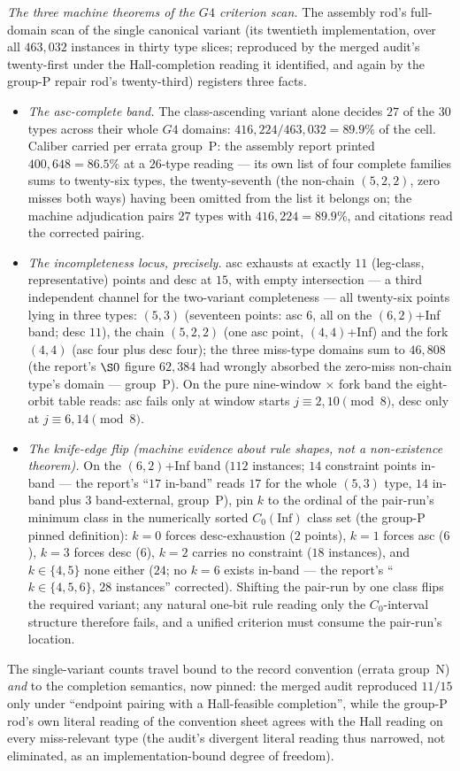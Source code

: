 \emph{The three machine theorems of the $G4$ criterion scan.} The assembly
rod's full-domain scan of the single canonical variant (its twentieth
implementation, over all $463{,}032$ instances in thirty type slices;
reproduced by the merged audit's twenty-first under the Hall-completion
reading it identified, and again by the group-P repair rod's twenty-third)
registers three facts.
\begin{itemize}
\item \emph{The asc-complete band.} The class-ascending variant alone decides
$27$ of the $30$ types across their whole $G4$ domains:
$416{,}224/463{,}032=89.9\%$ of the cell. Caliber carried per errata
group~P: the assembly report printed $400{,}648=86.5\%$ at a $26$-type
reading --- its own list of four complete families sums to twenty-six types,
the twenty-seventh (the non-chain $(5,2,2)$, zero misses both ways) having
been omitted from the list it belongs on; the machine adjudication pairs
$27$ types with $416{,}224=89.9\%$, and citations read the corrected pairing.
\item \emph{The incompleteness locus, precisely.} asc exhausts at exactly
$11$ (leg-class, representative) points and desc at $15$, with empty
intersection --- a third independent channel for the two-variant
completeness --- all twenty-six points lying in three types: $(5,3)$
(seventeen points: asc $6$, all on the $(6,2)$+Inf band; desc $11$), the
chain $(5,2,2)$ (one asc point, $(4,4)$+Inf) and the fork $(4,4)$ (asc four
plus desc four); the three miss-type domains sum to $46{,}808$ (the report's
$\S0$ figure $62{,}384$ had wrongly absorbed the zero-miss non-chain type's
domain --- group~P). On the pure nine-window $\times$ fork band the
eight-orbit table reads: asc fails only at window starts
$j\equiv2,10\pmod8$, desc only at $j\equiv6,14\pmod8$.
\item \emph{The knife-edge flip (machine evidence about rule shapes, not a
non-existence theorem).} On the $(6,2)$+Inf band ($112$ instances; $14$
constraint points in-band --- the report's ``$17$ in-band'' reads $17$ for
the whole $(5,3)$ type, $14$ in-band plus $3$ band-external, group~P), pin
$k$ to the ordinal of the pair-run's minimum class in the numerically sorted
$C_0(\mathrm{Inf})$ class set (the group-P pinned definition): $k=0$ forces
desc-exhaustion ($2$ points), $k=1$ forces asc ($6$), $k=3$ forces desc
($6$), $k=2$ carries no constraint ($18$ instances), and $k\in\{4,5\}$ none
either ($24$; no $k=6$ exists in-band --- the report's
``$k\in\{4,5,6\}$, $28$ instances'' corrected). Shifting the pair-run by one
class flips the required variant; any natural one-bit rule reading only the
$C_0$-interval structure therefore fails, and a unified criterion must
consume the pair-run's location.
\end{itemize}
The single-variant counts travel bound to the record convention (errata
group~N) \emph{and} to the completion semantics, now pinned: the merged audit
reproduced $11/15$ only under ``endpoint pairing with a Hall-feasible
completion'', while the group-P rod's own literal reading of the convention
sheet agrees with the Hall reading on every miss-relevant type (the audit's
divergent literal reading thus narrowed, not eliminated, as an
implementation-bound degree of freedom).

